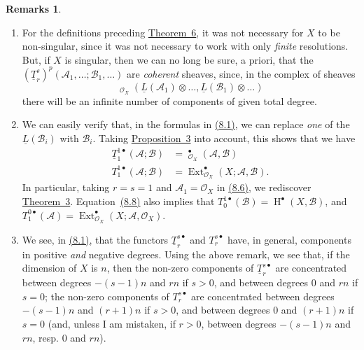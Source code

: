 \documentclass{article}
\theoremstyle{plain}
\theoremstyle{definition}
\newtheorem*{remarks}{Remarks}
\newcommand{\scr}[1]{{\mathscr{#1}}}
\DeclareMathOperator{\Ext}{Ext}
\DeclareMathOperator{\shExt}{\underline{Ext}}
\DeclareMathOperator{\shHom}{\underline{Hom}}
\DeclareMathOperator{\HH}{H}
\newcommand{\oldpage}[1]{\marginpar{\footnotesize$\Big\vert$ \textit{p.~#1}}}
\begin{document}
\oldpage{149-24}
\begin{remarks}
  \begin{enumerate}
    \item For the definitions preceding \hyperref[theorem6]{Theorem~6}, it was not necessary for $X$ to be non-singular, since it was not necessary to work with only \emph{finite} resolutions.
      But, if $X$ is singular, then we can no long be sure, a priori, that the $(\underline{T}_r^s)^p(\scr{A}_1,\ldots;\scr{B}_1,\ldots)$ are \emph{coherent} sheaves, since, in the complex of sheaves
      \[
        \shHom_{\scr{O}_X}(\underline{L}(\scr{A}_1)\otimes\ldots,\underline{L}(\scr{B}_1)\otimes\ldots)
      \]
      there will be an infinite number of components of given total degree.
    \item We can easily verify that, in the formulas in \hyperref[8.1]{(8.1)}, we can replace \emph{one} of the $\underline{L}(\scr{B}_i)$ with $\scr{B}_i$.
      Taking \hyperref[proposition3]{Proposition~3} into account, this shows that we have
      \[
      \label{8.8}
        \begin{aligned}
          \underline{T}_1^{1\bullet}(\scr{A};\scr{B})
          &= \shExt_{\scr{O}_X}^\bullet(\scr{A},\scr{B})
        \\T_1^{1\bullet}(\scr{A};\scr{B})
          &= \Ext_{\scr{O}_X}^\bullet(X;\scr{A},\scr{B}).
        \end{aligned}
      \tag{8.8}
      \]
      In particular, taking $r=s=1$ and $\scr{A}_1=\scr{O}_X$ in \hyperref[8.6]{(8.6)}, we rediscover \hyperref[theorem3]{Theorem~3}.
      Equation~\hyperref[8.8]{(8.8)} also implies that $T_0^{1\bullet}(\scr{B})=\HH^\bullet(X,\scr{B})$, and $T_1^{0\bullet}(\scr{A})=\Ext_{\scr{O}_X}^\bullet(X;\scr{A},\scr{O}_X)$.
    \item We see, in \hyperref[8.1]{(8.1)}, that the functors $\underline{T}_r^{s\bullet}$ and $T_r^{s\bullet}$ have, in general, components in positive \emph{and} negative degrees.
      Using the above remark, we see that, if the dimension of $X$ is $n$, then the non-zero components of $\underline{T}_r^{s\bullet}$ are concentrated between degrees $-(s-1)n$ and $rn$ if $s>0$, and between degrees $0$ and $rn$ if $s=0$; the non-zero components of $T_r^{s\bullet}$ are concentrated between degrees $-(s-1)n$ and $(r+1)n$ if $s>0$, and between degrees $0$ and $(r+1)n$ if $s=0$ (and, unless I am mistaken, if $r>0$, between degrees $-(s-1)n$ and $rn$, resp. $0$ and $rn$).
  \end{enumerate}
\end{remarks}
\end{document}
